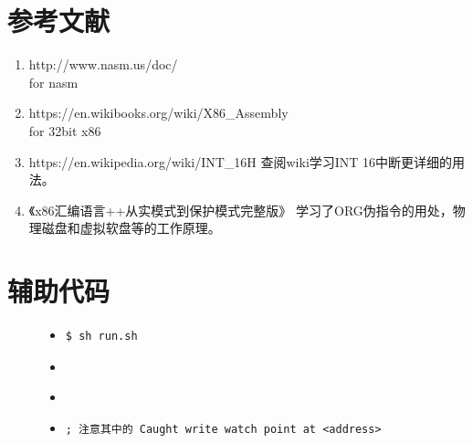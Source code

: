 \documentclass[a4paper]{article}
\begin{document}
\begin{appendices}
\section{参考文献} \label{sec:reference}
\begin{enumerate}
    \item http://www.nasm.us/doc/ \\
    for nasm
    \item https://en.wikibooks.org/wiki/X86\_Assembly \\
    for 32bit x86
    \item https://en.wikipedia.org/wiki/INT\_16H
    查阅wiki学习INT 16中断更详细的用法。
    \item 《x86汇编语言++从实模式到保护模式完整版》
    学习了ORG伪指令的用处，物理磁盘和虚拟软盘等的工作原理。
  \end{enumerate}
    \section{辅助代码}\label{sec:utilitycode}
    \begin{figure}[H]
    \begin{itemize}
    \item[] \begin{lstlisting}[language=sh, label=lst:run, caption=运行本项目的方法]
$ sh run.sh
    \end{lstlisting}
    \end{itemize}
    \end{figure}
    \begin{figure}[H]
    \begin{itemize}
        \item[]
    \end{itemize}
    \end{figure}

    \begin{figure}[H]
    \begin{itemize}
        \item[]
    \end{itemize}
    \end{figure}

    \begin{figure}
    \begin{itemize}
    \item[] \begin{lstlisting}[label=lst:errorlog, caption=DEBUG过程中捕捉到的错误信息。栈溢出意外修改到代码段内存]
; 注意其中的 Caught write watch point at <address>
    

\end{lstlisting}
\end{itemize}
\end{figure}
\end{appendices}
\end{document}
